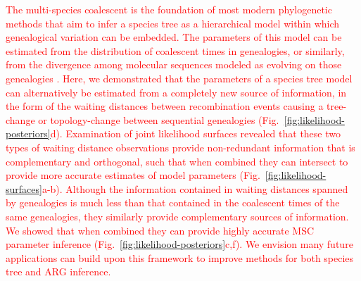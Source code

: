 \documentclass[11pt]{article}
\begin{document}
\textcolor{red}{
The multi-species coalescent is the foundation of most modern 
phylogenetic methods that aim to infer a species tree as a hierarchical
model within which genealogical variation can be embedded. 
% 
The parameters of this model can be estimated from the distribution
of coalescent times in genealogies, or similarly, from the divergence
among molecular sequences modeled as evolving on those genealogies
\citep{maddison1997gene,maddison2006inferring,rannala2003bayes}. 
% 
% 
Here, we demonstrated that the parameters of a species tree model can 
alternatively be estimated from a completely new source of information,
in the form of the waiting distances between recombination events causing
a tree-change or topology-change between sequential genealogies
(Fig.~\ref{fig:likelihood-posteriors}d).
% 
Examination of joint likelihood surfaces revealed that these two 
types of waiting distance observations provide non-redundant 
information that is complementary and orthogonal, such that when
combined they can intersect to provide more accurate estimates of 
model parameters
(Fig.~\ref{fig:likelihood-surfaces}a-b). 
% 
Although the information contained in waiting distances spanned by
genealogies is much less than that contained in the coalescent times
of the same genealogies, they similarly provide complementary sources
of information. We showed that when combined they can provide 
highly accurate MSC parameter inference
(Fig.~\ref{fig:likelihood-posteriors}c,f).
% 
% 
We envision many future applications can build upon this framework
to improve methods for both species tree and ARG inference.
}
\end{document}
